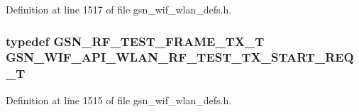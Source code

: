 Definition at line 1517 of file gsn\_\-wif\_\-wlan\_\-defs.h.

\hypertarget{a00613_ab1ebe3ba2318fea51b5dcb7b15d536d8}{
\subsubsection[{GSN\_\-WIF\_\-API\_\-WLAN\_\-RF\_\-TEST\_\-TX\_\-START\_\-REQ\_\-T}]{\setlength{\rightskip}{0pt plus 5cm}typedef {\bf GSN\_\-RF\_\-TEST\_\-FRAME\_\-TX\_\-T} {\bf GSN\_\-WIF\_\-API\_\-WLAN\_\-RF\_\-TEST\_\-TX\_\-START\_\-REQ\_\-T}}}
\label{a00613_ab1ebe3ba2318fea51b5dcb7b15d536d8}


Definition at line 1515 of file gsn\_\-wif\_\-wlan\_\-defs.h.

